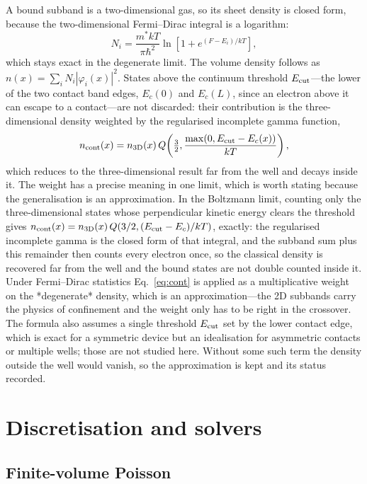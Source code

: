 \documentclass[preprint,12pt]{elsarticle}
\begin{document}
A bound subband is a two-dimensional gas, so its sheet density is closed form,
because the two-dimensional Fermi--Dirac integral is a logarithm:
\begin{equation}
  N_i = \frac{m^{*}kT}{\pi\hbar^2}\ln\!\left[1+e^{(F-E_i)/kT}\right],
  \label{eq:2d}
\end{equation}
which stays exact in the degenerate limit. The volume density follows as
$n(x)=\sum_iN_i|\varphi_i(x)|^2$. States above the continuum threshold
$E_{\rm cut}$---the lower of the two contact band edges, $E_c(0)$ and
$E_c(L)$, since an electron above it can escape to a contact---are not
discarded: their
contribution is the three-dimensional density weighted by the regularised
incomplete gamma function,
\begin{equation}
  n_{\rm cont}(x) = n_{\rm 3D}(x)\,
  Q\!\left(\tfrac32, \frac{\max(0,E_{\rm cut}-E_c(x))}{kT}\right),
  \label{eq:cont}
\end{equation}
which reduces to the three-dimensional result far from the well and decays
inside it. The weight has a precise meaning in one limit, which is worth
stating because the generalisation is an approximation. In the Boltzmann
limit, counting only the three-dimensional states whose perpendicular kinetic
energy clears the threshold gives
$n_{\rm cont}(x)=n_{\rm 3D}(x)\,Q(3/2,(E_{\rm cut}-E_c)/kT)$, exactly: the
regularised incomplete gamma is the closed form of that integral, and the
subband sum plus this remainder then counts every electron once, so the
classical density is recovered far from the well and the bound states are not
double counted inside it. Under Fermi--Dirac statistics Eq.~\eqref{eq:cont}
is applied as a multiplicative weight on the *degenerate* density, which is
an approximation---the 2D subbands carry the physics of confinement and the
weight only has to be right in the crossover. The formula also assumes a
single threshold $E_{\rm cut}$ set by the lower contact edge, which is
exact for a symmetric device but an idealisation for asymmetric contacts or
multiple wells; those are not studied here. Without some such term the
density outside the well would vanish, so the approximation is kept and its
status recorded.

\section{Discretisation and solvers}
\label{sec:numerics}

\subsection{Finite-volume Poisson}
\end{document}
